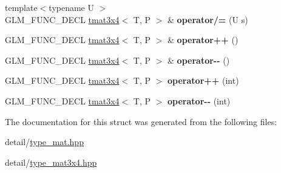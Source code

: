 \begin{DoxyCompactItemize}
\item 
\hypertarget{structglm_1_1tmat3x4_a378211e46414746911e99ed1499a12bf}{{\footnotesize template$<$typename U $>$ }\\G\-L\-M\-\_\-\-F\-U\-N\-C\-\_\-\-D\-E\-C\-L \hyperlink{structglm_1_1tmat3x4}{tmat3x4}$<$ T, P $>$ \& {\bfseries operator/=} (U s)}\label{structglm_1_1tmat3x4_a378211e46414746911e99ed1499a12bf}

\item 
\hypertarget{structglm_1_1tmat3x4_a210ffe19c82b0f6e3d563af82b938249}{G\-L\-M\-\_\-\-F\-U\-N\-C\-\_\-\-D\-E\-C\-L \hyperlink{structglm_1_1tmat3x4}{tmat3x4}$<$ T, P $>$ \& {\bfseries operator++} ()}\label{structglm_1_1tmat3x4_a210ffe19c82b0f6e3d563af82b938249}

\item 
\hypertarget{structglm_1_1tmat3x4_a69380f84ec0732f0582c94c4d1e175c6}{G\-L\-M\-\_\-\-F\-U\-N\-C\-\_\-\-D\-E\-C\-L \hyperlink{structglm_1_1tmat3x4}{tmat3x4}$<$ T, P $>$ \& {\bfseries operator-\/-\/} ()}\label{structglm_1_1tmat3x4_a69380f84ec0732f0582c94c4d1e175c6}

\item 
\hypertarget{structglm_1_1tmat3x4_a9ccad88368ba8788cec3847741fa507d}{G\-L\-M\-\_\-\-F\-U\-N\-C\-\_\-\-D\-E\-C\-L \hyperlink{structglm_1_1tmat3x4}{tmat3x4}$<$ T, P $>$ {\bfseries operator++} (int)}\label{structglm_1_1tmat3x4_a9ccad88368ba8788cec3847741fa507d}

\item 
\hypertarget{structglm_1_1tmat3x4_a22dea453f98b69c83f850166ba0aefb4}{G\-L\-M\-\_\-\-F\-U\-N\-C\-\_\-\-D\-E\-C\-L \hyperlink{structglm_1_1tmat3x4}{tmat3x4}$<$ T, P $>$ {\bfseries operator-\/-\/} (int)}\label{structglm_1_1tmat3x4_a22dea453f98b69c83f850166ba0aefb4}

\end{DoxyCompactItemize}


The documentation for this struct was generated from the following files\-:\begin{DoxyCompactItemize}
\item 
detail/\hyperlink{type__mat_8hpp}{type\-\_\-mat.\-hpp}\item 
detail/\hyperlink{type__mat3x4_8hpp}{type\-\_\-mat3x4.\-hpp}\end{DoxyCompactItemize}
